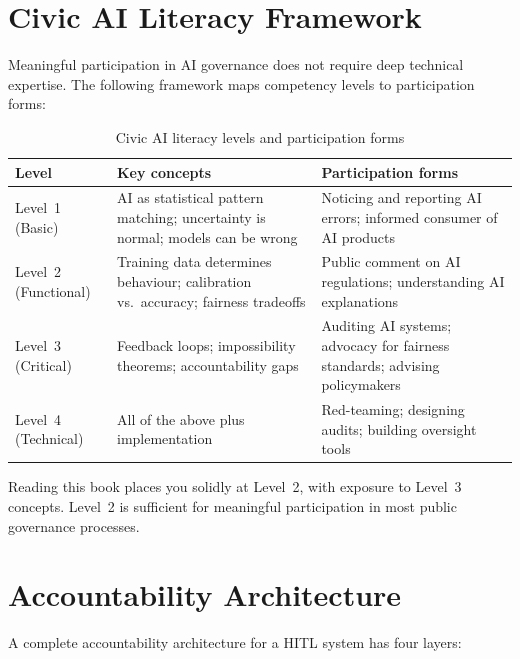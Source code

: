 \section{Civic AI Literacy Framework}

Meaningful participation in AI governance does not require deep technical expertise. The following framework maps competency levels to participation forms:

\begin{table}[h]
\centering
\caption{Civic AI literacy levels and participation forms}
\begin{tabularx}{\textwidth}{@{}>{\raggedright\arraybackslash}p{2cm}YY@{}}
\hline
\textbf{Level} & \textbf{Key concepts} & \textbf{Participation forms} \\
\hline
Level~1 (Basic) &
  AI as statistical pattern matching; uncertainty is normal; models can be wrong &
  Noticing and reporting AI errors; informed consumer of AI products \\[4pt]
Level~2 (Functional) &
  Training data determines behaviour; calibration vs.\ accuracy; fairness tradeoffs &
  Public comment on AI regulations; understanding AI explanations \\[4pt]
Level~3 (Critical) &
  Feedback loops; impossibility theorems; accountability gaps &
  Auditing AI systems; advocacy for fairness standards; advising policymakers \\[4pt]
Level~4 (Technical) &
  All of the above plus implementation &
  Red-teaming; designing audits; building oversight tools \\
\hline
\end{tabularx}
\end{table}

Reading this book places you solidly at Level~2, with exposure to Level~3 concepts. Level~2 is sufficient for meaningful participation in most public governance processes.

\section{Accountability Architecture}

A complete accountability architecture for a HITL system has four layers:

